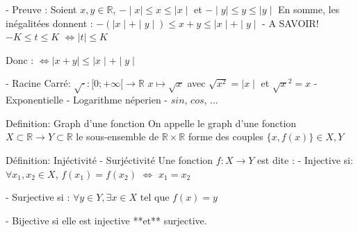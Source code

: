 \documentclass{article}
\begin{document}
			- Preuve :
			Soient $x, y\in \mathbb{R}$,
			$-\mid x\mid \leqslant x\leqslant\mid x\mid$
			et $-\mid y\mid \leqslant y\leqslant\mid y\mid$
			En somme, les inégalitées donnent : $-(\mid x\mid + \mid y\mid) \leqslant x+y\leqslant\mid x\mid+\mid y\mid$
			- A SAVOIR!
			$-K\leqslant t\leqslant K$
			$\iff \mid t\mid\leqslant K$
			
			Donc : $\iff\mid x+y\mid \leqslant\mid x\mid + \mid y\mid$

		- Racine Carré:
			$\sqrt\cdot: [0; +\infty[\rightarrow\mathbb{R}$
			$x \mapsto\sqrt x$
			avec $\sqrt{x^{2}} = \mid x\mid$ et $\sqrt{x}^{2} = x$
		- Exponentielle
		- Logarithme néperien
		- $sin$, $cos$, ...

	Definition: Graph d'une fonction
	On appelle le graph d'une fonction $X\subset\mathbb{R}\rightarrow Y\subset\mathbb{R}$ le sous-ensemble de $\mathbb{R}\times\mathbb{R}$ forme des couples $\{x, f(x)\}\in X, Y$

	Définition: Injéctivité - Surjéctivité
	Une fonction $f: X \rightarrow Y$ est dite :
	- Injective si:
	$\forall x_{1}, x_{2} \in X$, $f(x_{1}) = f(x_{2})$
	$\iff$ $x_{1} = x_{2}$

	- Surjective si :
	$\forall y\in Y, \exists x\in X$ tel que $f(x) = y$

	- Bijective  si elle est injective **et** surjective. 
\end{document}

